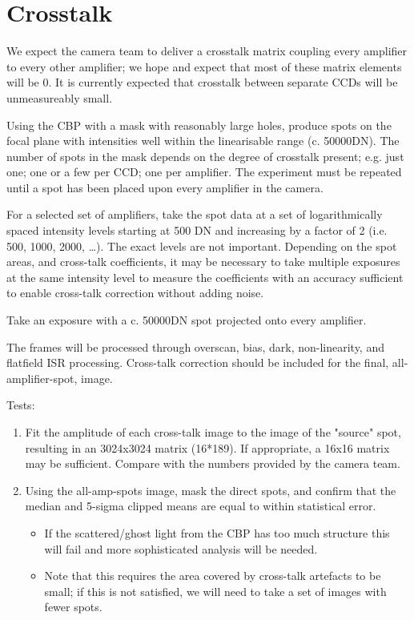 \documentclass[DM,authoryear,toc,lsstdraft]{lsstdoc}
\begin{document}
\section{Crosstalk}

We expect the camera team to deliver a crosstalk matrix coupling every amplifier to every other amplifier; we
hope and expect that most of these matrix elements will be 0.  It is currently expected that crosstalk between
separate CCDs will be unmeasureably small.

Using the CBP with a mask with reasonably large holes, produce spots on the focal plane with intensities well
within the linearisable range (c. 50000DN).  The number of spots in the mask depends on the degree of
crosstalk present; e.g. just one; one or a few per CCD; one per amplifier.  The experiment must be repeated
until a spot has been placed upon every amplifier in the camera.

For a selected set of amplifiers, take the spot data at a set of logarithmically spaced intensity levels
starting at 500 DN and increasing by a factor of 2 (i.e. 500, 1000, 2000, \ldots{}).  The exact levels are not
important.  Depending on the spot areas, and cross-talk coefficients, it may be necessary to take multiple
exposures at the same intensity level to measure the coefficients with an accuracy sufficient to enable
cross-talk correction without adding noise.

Take an exposure with a c. 50000DN spot projected onto every amplifier.

The frames will be processed through overscan, bias, dark, non-linearity, and flatfield ISR
processing. Cross-talk correction should be included for the final, all-amplifier-spot, image.

Tests:
\begin{enumerate}
\item Fit the amplitude of each cross-talk image to the image of the "source" spot, resulting in an 3024x3024
matrix (16*189).  If appropriate, a 16x16 matrix may be sufficient.  Compare with the numbers provided by
the camera team.
\item Using the all-amp-spots image, mask the direct spots, and confirm that the median and 5-sigma clipped means
are equal to within statistical error.
\begin{itemize}
\item If the scattered/ghost light from the CBP has too much structure this will fail and more sophisticated
analysis will be needed.
\item Note that this requires the area covered by cross-talk artefacts to be small; if this is not satisfied, we
will need to take a set of images with fewer spots.
\end{itemize}
\end{enumerate}
\end{document}
